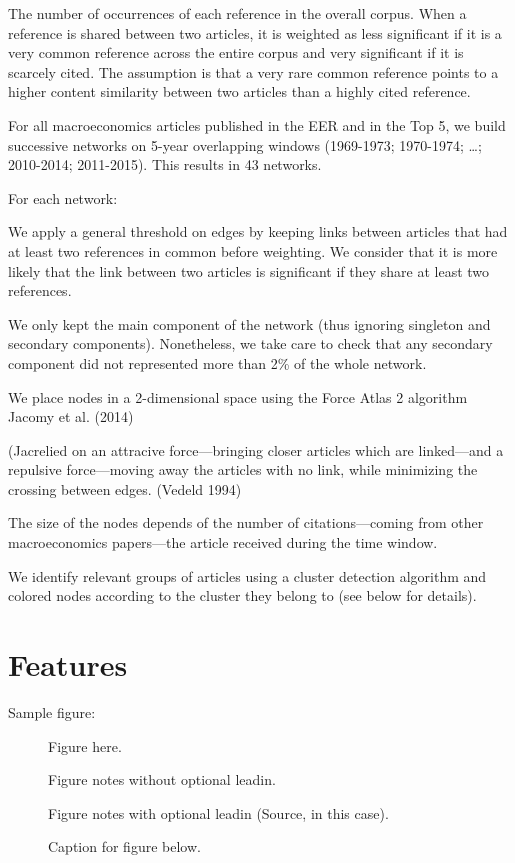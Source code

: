 \documentclass[JEL]{AEA}
\begin{document}
The number of occurrences of each reference in the overall corpus. When
a reference is shared between two articles, it is weighted as less
significant if it is a very common reference across the entire corpus
and very significant if it is scarcely cited. The assumption is that a
very rare common reference points to a higher content similarity between
two articles than a highly cited reference.

For all macroeconomics articles published in the EER and in the Top 5,
we build successive networks on 5-year overlapping windows (1969-1973;
1970-1974; \ldots; 2010-2014; 2011-2015). This results in 43 networks.

For each network:

We apply a general threshold on edges by keeping links between articles
that had at least two references in common before weighting. We consider
that it is more likely that the link between two articles is significant
if they share at least two references.

We only kept the main component of the network (thus ignoring singleton
and secondary components). Nonetheless, we take care to check that any
secondary component did not represented more than 2\% of the whole
network.

We place nodes in a 2-dimensional space using the Force Atlas 2
algorithm Jacomy et al. (2014)

(Jacrelied on an attracive force---bringing closer articles which are
linked---and a repulsive force---moving away the articles with no link,
while minimizing the crossing between edges. (Vedeld 1994)

The size of the nodes depends of the number of citations---coming from
other macroeconomics papers---the article received during the time
window.

We identify relevant groups of articles using a cluster detection
algorithm and colored nodes according to the cluster they belong to (see
below for details).

\section{Features}

Sample figure:

\begin{figure}
Figure here.

\caption{Caption for figure below.}
\begin{figurenotes}
Figure notes without optional leadin.
\end{figurenotes}
\begin{figurenotes}[Source]
Figure notes with optional leadin (Source, in this case).
\end{figurenotes}
\end{figure}
\end{document}
